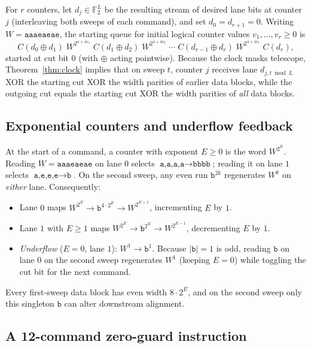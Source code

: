 \documentclass{article}
\theoremstyle{definition}
\theoremstyle{remark}
\newcommand{\Ftwo}{\mathbb{F}_2}
\newcommand{\ttw}[1]{\texttt{#1}}
\begin{document}
For $r$ counters, let $d_j \in \Ftwo^L$ be the resulting stream of desired lane bits at counter $j$ (interleaving both sweeps of each command), and set $d_0 = d_{r+1} = 0$.
Writing $W = \ttw{aaaeaeae}$, the starting queue for initial logical counter values $v_1, \ldots, v_r \ge 0$ is
\begin{equation}\label{eq:layout}
C(d_0 \oplus d_1)\; W^{2^{4+4v_1}}\; C(d_1 \oplus d_2)\; W^{2^{4+4v_2}}\; \cdots\; C(d_{r-1} \oplus d_r)\; W^{2^{4+4v_r}}\; C(d_r),
\end{equation}
started at cut bit $0$ (with $\oplus$ acting pointwise).
Because the clock masks telescope, Theorem~\ref{thm:clock} implies that on sweep $t$, counter $j$ receives lane $d_{j,t \bmod L}$ XOR the starting cut XOR the width parities of earlier data blocks, while the outgoing cut equals the starting cut XOR the width parities of \emph{all} data blocks.

\subsection{Exponential counters and underflow feedback}

At the start of a command, a counter with exponent $E \ge 0$ is the word $W^{2^E}$.
Reading $W = \ttw{aaaeaeae}$ on lane $0$ selects $\ttw{a,a,a,a} \to \ttw{bbbb}$; reading it on lane $1$ selects $\ttw{a,e,e,e} \to \ttw{b}$.
On the second sweep, any even run $\ttw{b}^{2k}$ regenerates $W^k$ on \emph{either} lane.
Consequently:
\begin{itemize}
\item Lane $0$ maps $W^{2^E} \to \ttw{b}^{4 \cdot 2^E} \to W^{2^{E+1}}$, incrementing $E$ by $1$.
\item Lane $1$ with $E \ge 1$ maps $W^{2^E} \to \ttw{b}^{2^E} \to W^{2^{E-1}}$, decrementing $E$ by $1$.
\item \emph{Underflow} ($E=0$, lane $1$): $W^1 \to \ttw{b}^1$. Because $|\ttw{b}| = 1$ is odd, reading $\ttw{b}$ on lane $0$ on the second sweep regenerates $W^1$ (keeping $E=0$) while toggling the cut bit for the next command.
\end{itemize}
Every first-sweep data block has even width $8 \cdot 2^E$, and on the second sweep only this singleton $\ttw{b}$ can alter downstream alignment.

\subsection{A 12-command zero-guard instruction}
\end{document}
